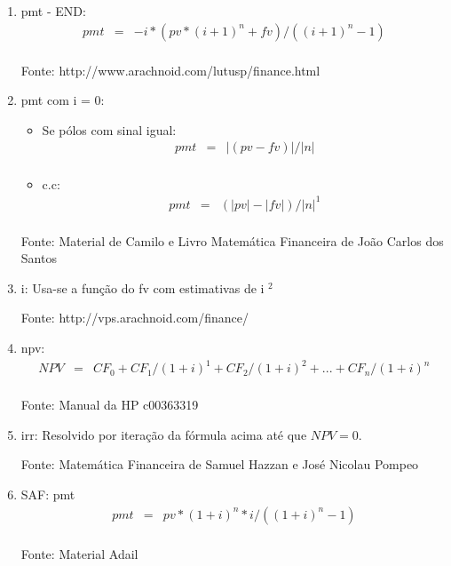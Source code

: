 \documentclass[a4paper,10pt]{article}
\begin{document}
\begin{enumerate}
\item  pmt - END:
\begin{eqnarray*}
	pmt &=& - i*( pv*(i+1)^{n} + fv ) / ((i+1)^{n} - 1) \\	
\end{eqnarray*}
 
 Fonte: http://www.arachnoid.com/lutusp/finance.html \\

\item  pmt com i = 0:  

\begin{itemize}
 \item Se pólos com sinal igual:
	\begin{eqnarray*}
 		 pmt &=& |(pv - fv)| / |n| \\	
	\end{eqnarray*}
  \item c.c:
	\begin{eqnarray*}
 		pmt &=& (|pv| - |fv|) / |n|  ^{1} \\	 
	\end{eqnarray*}
\end{itemize}

 Fonte: Material de Camilo e Livro Matemática Financeira de João Carlos dos Santos   

\item  i: Usa-se a função do fv com estimativas de i $ ^{2} $ 

 Fonte: http://vps.arachnoid.com/finance/

\item  npv:
\begin{eqnarray*}
 	NPV &=& CF_{0} + CF_{1} / (1+i)^{1} + CF_{2} / (1+i)^{2} + ... + CF_{n} / (1+i)^{n} \\
\end{eqnarray*}
 
 Fonte: Manual da HP c00363319

\item  irr: Resolvido por iteração da fórmula acima até que $ NPV = 0. $ 

 Fonte: Matemática Financeira de Samuel Hazzan e José Nicolau Pompeo

\item SAF: pmt 
\begin{eqnarray*}
 	pmt &=& pv * (1+i)^{n} * i / ((1+i)^{n}-1) \\
\end{eqnarray*}
 
 Fonte: Material Adail


\end{enumerate}
\end{document}

